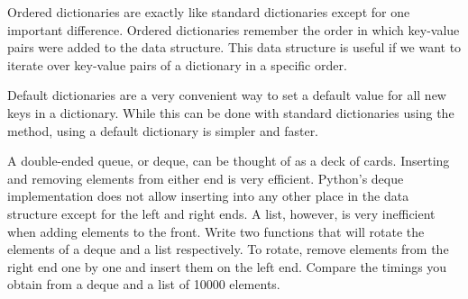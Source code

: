 Ordered dictionaries are exactly like standard dictionaries except for one important difference.
Ordered dictionaries remember the order in which key-value pairs were added to the data structure.
This data structure is useful if we want to iterate over key-value pairs of a dictionary in a specific order.

Default dictionaries are a very convenient way to set a default value for all new keys in a dictionary.
While this can be done with standard dictionaries using the  method, using a default dictionary is simpler and faster.

\begin{problem}
A double-ended queue, or deque, can be thought of as a deck of cards.
Inserting and removing elements from either end is very efficient.
Python's deque implementation does not allow inserting into any other place in the data structure except for the left and right ends.
A list, however, is very inefficient when adding elements to the front.
Write two functions that will rotate the elements of a deque and a list respectively.
To rotate, remove elements from the right end one by one and insert them on the left end.
Compare the timings you obtain from a deque and a list of 10000 elements.
\end{problem}
